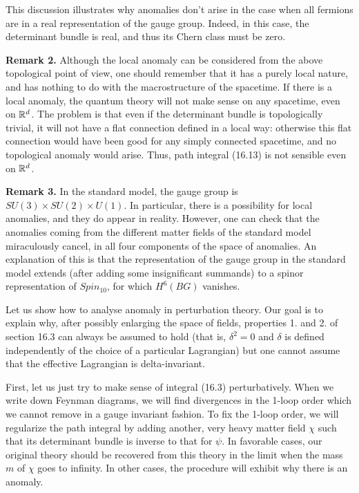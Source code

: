 This discussion illustrates why anomalies don't arise in the case when all 
fermions are in a real representation of the gauge group. Indeed, 
in this case, the determinant bundle is real, and thus its 
Chern class must be zero. 
 
{\bf Remark 2.} Although the local anomaly can be considered from 
the above topological point of view, one should remember that it has a purely 
local nature, and has nothing to do with the macrostructure of the spacetime. 
If there is a local anomaly, the quantum theory will not make sense 
on any spacetime, even on $\Bbb R^d$. The problem is that    
even if the determinant bundle is topologically 
trivial, it will not have a flat connection
defined in a local way: otherwise  
this flat connection would have been good for any simply connected 
spacetime, and 
no topological anomaly would arise. Thus, 
path integral (16.13) is not sensible even on $\Bbb R^d$. 

{\bf Remark 3.} In the standard model, the gauge group is 
$SU(3)\times SU(2)\times U(1)$. In particular,
there is a possibility for local anomalies, and they do appear in reality.
However, one can check that the anomalies 
coming from the different matter fields of the standard model 
miraculously cancel, in all four components of the space of anomalies. 
An explanation of this 
is that the representation of the gauge group in the standard model 
extends (after adding some insignificant summands) to a spinor representation 
of $Spin_{10}$, for which $H^6(BG)$ vanishes. 

Let us show how to analyse anomaly in perturbation theory.
Our goal is to explain why, after possibly enlarging the space of fields,
properties 1. and 2. of section 16.3 can always be assumed to hold
(that is, $\delta^2=0$ and $\delta$ is defined independently of the choice
of a particular Lagrangian) but one cannot assume that the effective Lagrangian
is delta-invariant. 

 First, let us just try to make sense of integral
(16.3) perturbatively.
When we write down Feynman diagrams, we will find divergences 
in the 1-loop order which we cannot remove in a gauge invariant fashion. 
To fix the 1-loop order, we will regularize the path integral 
by adding another, very heavy matter field $\chi$ such that its determinant 
bundle is inverse to that for $\psi$. In favorable cases, 
our original theory should be recovered from this theory in the limit 
when the mass $m$ of $\chi$ goes to infinity. 
In other cases, the procedure will exhibit why there is an anomaly.

